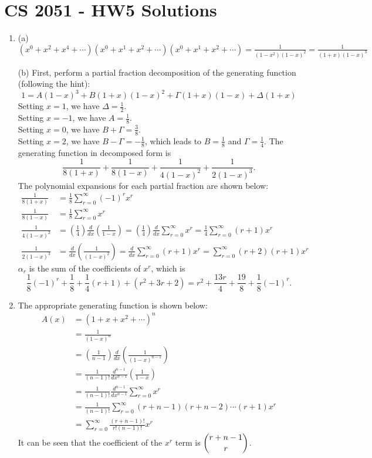 \documentclass[a4paper, 12pt]{article}
\begin{document}
	\section*{CS 2051 - HW5 Solutions}
	
	\begin{enumerate}
		\item (a) $(x^0 + x^2 + x^4 + \cdots)(x^0 + x^1 + x^2 + \cdots)(x^0 + x^1 + x^2 + \cdots) = \frac{1}{(1 - x^2)(1 - x)^2} = \frac{1}{(1 + x)(1 - x)^3}$ \par
		(b) First, perform a partial fraction decomposition of the generating function (following the hint):
		\[ 1 = A(1 - x)^3 + B(1 + x)(1 - x)^2 + \Gamma(1 + x)(1 - x) + \Delta(1 + x) \]
		Setting $x = 1$, we have $\Delta = \frac{1}{2}$. \\
		Setting $x = -1$, we have $A = \frac{1}{8}$. \\
		Setting $x = 0$, we have $B + \Gamma = \frac{3}{8}$. \\
		Setting $x = 2$, we have $B - \Gamma = -\frac{1}{8}$, which leads to $B = \frac{1}{8}$ and $\Gamma = \frac{1}{4}$. The generating function in decomposed form is
		\[ \frac{1}{8(1 + x)} + \frac{1}{8(1 - x)} + \frac{1}{4(1 - x)^2} + \frac{1}{2(1 - x)^3}. \]
		The polynomial expansions for each partial fraction are shown below:
		\begin{align*}
		\frac{1}{8(1 + x)} &= \frac{1}{8}\sum_{r = 0}^{\infty}(-1)^r x^r \\
		\frac{1}{8(1 - x)} &= \frac{1}{8}\sum_{r = 0}^{\infty}x^r \\
		\frac{1}{4(1 - x)^2} &= \left( \frac{1}{4} \right)\frac{d}{dx}\left( \frac{1}{1 - x} \right) = \left( \frac{1}{4} \right)\frac{d}{dx}\sum_{r = 0}^{\infty}x^r = \frac{1}{4}\sum_{r = 0}^{\infty}(r + 1)x^r \\
		\frac{1}{2(1 - x)^3} &= \frac{d}{dx}\left( \frac{1}{(1 - x)^2} \right) = \frac{d}{dx}\sum_{r = 0}^{\infty}(r + 1)x^r = \sum_{r = 0}^{\infty}(r + 2)(r + 1)x^r
		\end{align*}
		$\alpha_r$ is the sum of the coefficients of $x^r$, which is
		\[ \frac{1}{8}(-1)^r + \frac{1}{8} + \frac{1}{4}(r + 1) + (r^2 + 3r + 2) = r^2 + \frac{13r}{4} + \frac{19}{8} + \frac{1}{8}(-1)^r. \]
		
		\item The appropriate generating function is shown below:
		\begin{align*}
		A(x) &= (1 + x + x^2 + \cdots)^n \\
		&= \frac{1}{(1 - x)^n} \\
		&= \left( \frac{1}{n - 1} \right) \frac{d}{dx}\left( \frac{1}{(1 - x)^{n - 1}} \right) \\
		&= \frac{1}{(n - 1)!} \frac{d^{n - 1}}{dx^{n - 1}}\left( \frac{1}{1 - x} \right) \\
		&= \frac{1}{(n - 1)!} \frac{d^{n - 1}}{dx^{n - 1}}\sum_{r = 0}^{\infty}x^r \\
		&= \frac{1}{(n - 1)!} \sum_{r = 0}^{\infty}(r + n - 1)(r + n - 2)\cdots(r + 1)x^r \\
		&= \sum_{r = 0}^{\infty}\frac{(r + n - 1)!}{r!(n - 1)!}x^r
		\end{align*}
		It can be seen that the coefficient of the $x^r$ term is $\dbinom{r + n - 1}{r}$.
		

\end{enumerate}
\end{document}
